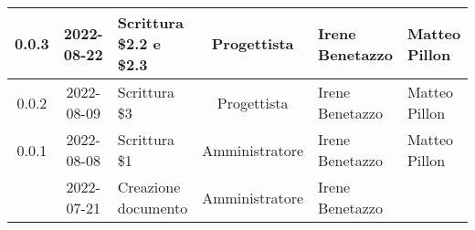 \begin{center}
\begin{longtable}{ |c|c|p{8em}|c|m{5em}|m{6em}| }
	\hline
	0.0.3 & 2022-08-22 & Scrittura \$2.2 e \$2.3 & Progettista & Irene \newline Benetazzo & Matteo Pillon\\ 
	\hline
    0.0.2 & 2022-08-09 & Scrittura \$3 & Progettista & Irene \newline Benetazzo & Matteo \newline Pillon \\ 
	\hline
	0.0.1 & 2022-08-08 & Scrittura \$1 & Amministratore & Irene \newline Benetazzo & Matteo Pillon\\ 
	\hline
	& 2022-07-21 & Creazione documento & Amministratore & Irene \newline Benetazzo & \\ 
	\hline
	\end{longtable}
	\end{center}
	\newpage